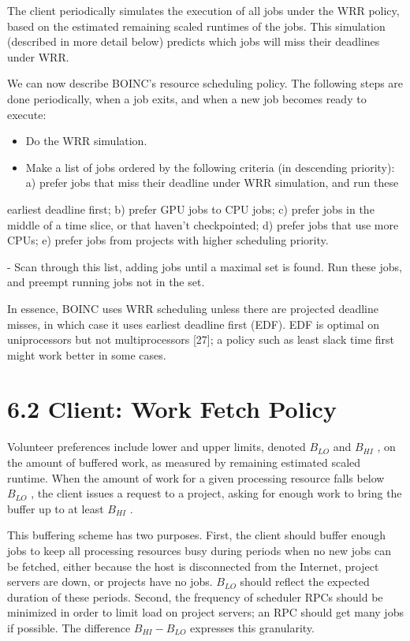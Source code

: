 \documentclass[
]{article}
\providecommand{\tightlist}{%
  \setlength{\itemsep}{0pt}\setlength{\parskip}{0pt}}
\begin{document}
The client periodically simulates the execution of all jobs under the
WRR policy, based on the estimated remaining scaled runtimes of the
jobs. This simulation (described in more detail below) predicts which
jobs will miss their deadlines under WRR.

We can now describe BOINC's resource scheduling policy. The following
steps are done periodically, when a job exits, and when a new job
becomes ready to execute:

\begin{itemize}
\tightlist
\item
  Do the WRR simulation.\\
\item
  Make a list of jobs ordered by the following criteria (in descending
  priority): a) prefer jobs that miss their deadline under WRR
  simulation, and run these
\end{itemize}

earliest deadline first; b) prefer GPU jobs to CPU jobs; c) prefer jobs
in the middle of a time slice, or that haven't checkpointed; d) prefer
jobs that use more CPUs; e) prefer jobs from projects with higher
scheduling priority.

- Scan through this list, adding jobs until a maximal set is found. Run
these jobs, and preempt running jobs not in the set.

In essence, BOINC uses WRR scheduling unless there are projected
deadline misses, in which case it uses earliest deadline first (EDF).
EDF is optimal on uniprocessors but not multiprocessors {[}27{]}; a
policy such as least slack time first might work better in some cases.

\section{6.2 Client: Work Fetch Policy}\label{client-work-fetch-policy}

Volunteer preferences include lower and upper limits, denoted \(B_{LO}\)
and \(B_{HI}\) , on the amount of buffered work, as measured by
remaining estimated scaled runtime. When the amount of work for a given
processing resource falls below \(B_{LO}\) , the client issues a request
to a project, asking for enough work to bring the buffer up to at least
\(B_{HI}\) .

This buffering scheme has two purposes. First, the client should buffer
enough jobs to keep all processing resources busy during periods when no
new jobs can be fetched, either because the host is disconnected from
the Internet, project servers are down, or projects have no jobs.
\(B_{LO}\) should reflect the expected duration of these periods.
Second, the frequency of scheduler RPCs should be minimized in order to
limit load on project servers; an RPC should get many jobs if possible.
The difference \(B_{HI} - B_{LO}\) expresses this granularity.
\end{document}
